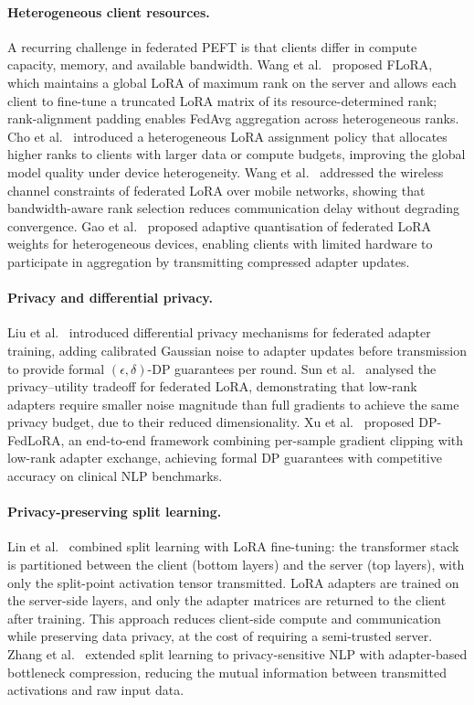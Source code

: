 \paragraph{Heterogeneous client resources.}
A recurring challenge in federated PEFT is that clients differ in compute capacity,
memory, and available bandwidth. Wang et al.~\cite{WangFLoRA2024} proposed FLoRA, which maintains
a global LoRA of maximum rank on the server and allows each client to fine-tune a
truncated LoRA matrix of its resource-determined rank; rank-alignment padding enables
FedAvg aggregation across heterogeneous ranks. Cho et al.~\cite{ChoHeteroLoRA2024} introduced a
heterogeneous LoRA assignment policy that allocates higher ranks to clients with larger
data or compute budgets, improving the global model quality under device heterogeneity.
Wang et al.~\cite{WangGlobecom2024} addressed the wireless channel constraints of federated
LoRA over mobile networks, showing that bandwidth-aware rank selection reduces
communication delay without degrading convergence. Gao et al.~\cite{GaoINFOCOM2025} proposed
adaptive quantisation of federated LoRA weights for heterogeneous devices, enabling
clients with limited hardware to participate in aggregation by transmitting compressed
adapter updates.

\paragraph{Privacy and differential privacy.}
Liu et al.~\cite{LiuDP2023} introduced differential privacy mechanisms for federated adapter
training, adding calibrated Gaussian noise to adapter updates before transmission to
provide formal $(\epsilon, \delta)$-DP guarantees per round. Sun et al.~\cite{SunImprovingLoRA2024}
analysed the privacy--utility tradeoff for federated LoRA, demonstrating that low-rank
adapters require smaller noise magnitude than full gradients to achieve the same
privacy budget, due to their reduced dimensionality. Xu et al.~\cite{XuDPFedLoRA2025} proposed
DP-FedLoRA, an end-to-end framework combining per-sample gradient clipping with
low-rank adapter exchange, achieving formal DP guarantees with competitive accuracy
on clinical NLP benchmarks.

\paragraph{Privacy-preserving split learning.}
Lin et al.~\cite{LinSplitLoRA2024} combined split learning with LoRA fine-tuning: the transformer
stack is partitioned between the client (bottom layers) and the server (top layers), with
only the split-point activation tensor transmitted. LoRA adapters are trained on the
server-side layers, and only the adapter matrices are returned to the client after
training. This approach reduces client-side compute and communication while preserving
data privacy, at the cost of requiring a semi-trusted server. Zhang et al.~\cite{ZhangPrivacySplit2023}
extended split learning to privacy-sensitive NLP with adapter-based bottleneck compression,
reducing the mutual information between transmitted activations and raw input data.

